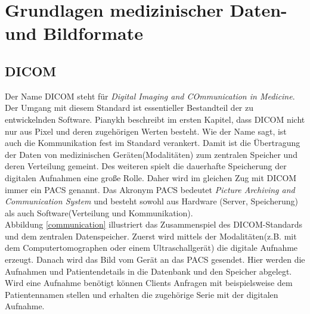 \chapter{Grundlagen medizinischer Daten- und Bildformate} \label{grundlagen}


\section{DICOM}\label{grundlagen:dicom}
Der Name DICOM steht für \textit{Digital Imaging and COmmunication in Medicine}. Der Umgang mit diesem Standard ist essentieller Bestandteil der zu entwickelnden Software. Pianykh\cite{pianykh:dicom} beschreibt im ersten Kapitel, dass DICOM nicht nur aus Pixel und deren zugehörigen Werten besteht. Wie der Name sagt, ist auch die Kommunikation fest im Standard verankert. Damit ist die Übertragung der Daten von medizinischen Geräten(Modalitäten) zum zentralen Speicher und deren Verteilung gemeint. Des weiteren spielt die dauerhafte Speicherung der digitalen Aufnahmen eine große Rolle. Daher wird im gleichen Zug mit DICOM immer ein PACS genannt. Das Akronym PACS bedeutet \textit{Picture Archiving and Communication System} und besteht sowohl aus Hardware (Server, Speicherung) als auch Software(Verteilung und Kommunikation).\\
Abbildung \ref{communication} illustriert das Zusammenspiel des DICOM-Standards und dem zentralen Datenspeicher. Zuerst wird mittels der Modalitäten(z.B. mit dem Computertomographen oder einem Ultraschallgerät) die digitale Aufnahme erzeugt. Danach wird das Bild vom Gerät an das PACS gesendet. Hier werden die Aufnahmen und Patientendetails in die Datenbank und den Speicher abgelegt. Wird eine Aufnahme benötigt können Clients Anfragen mit beispielsweise dem Patientennamen stellen und erhalten die zugehörige Serie mit der digitalen Aufnahme.

